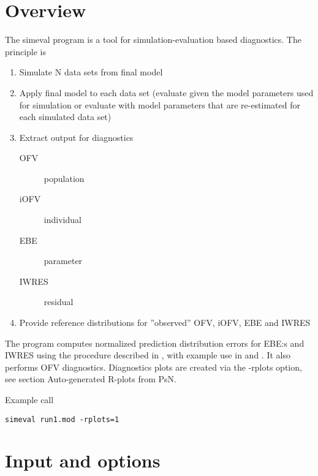 



\maketitle
\newcommand{\guidetoolname}{simeval}


\section{Overview}

The simeval program is a tool for simulation-evaluation based diagnostics.
The principle is 
\begin{enumerate}
\item Simulate N data sets from final model
\item Apply final model to each data set (evaluate given the model parameters used for simulation or evaluate with model parameters that are re-estimated for each simulated data set)
\item Extract output for diagnostics
\begin{description}
\item[OFV] population
\item[iOFV] individual
\item[EBE] parameter
\item[IWRES] residual
\end{description}
\item Provide reference distributions for ”observed” OFV, iOFV, EBE and IWRES
\end{enumerate}
The program computes normalized prediction distribution errors for EBE:s and IWRES 
using the procedure described in \cite{Comets}, with example use in \cite{Keizer} and \cite{Largajolli}.
It also performs OFV diagnostics. Diagnostics plots are created via the -rplots option, see section 
Auto-generated R-plots from PsN.

Example call
\begin{verbatim}
simeval run1.mod -rplots=1
\end{verbatim}

\section{Input and options}

